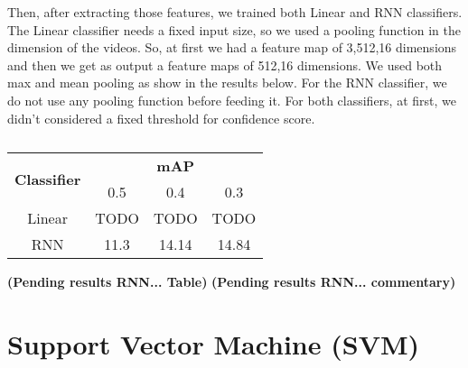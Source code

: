 Then, after extracting those features, we trained both Linear and RNN classifiers. The Linear classifier needs a fixed input size,
so we used a pooling function in the dimension of the videos. So, at first we had a feature map of 3,512,16 dimensions and then we
get as output a feature maps of 512,16 dimensions. We used both max and mean pooling as show in the results below. For the RNN
classifier, we do not use any pooling function before feeding it. For both classifiers, at first, we didn't considered a fixed
threshold for confidence score. 

\begin{table}[h]
  \centering
  \begin{tabular}{|| c || c  c  c ||}
    \hline
    \multirow{2}{*}{\textbf{Classifier}} & {} & \textbf{mAP} & {} \\
    {} & 0.5 & 0.4 & 0.3 \\
    \hline
    Linear & TODO & TODO & TODO \\
    \hline
    RNN    & 11.3 & 14.14 & 14.84 \\
    \hline
  \end{tabular}
  \caption{}
  \label{fig:rnn_linear}
\end{table}

  
\textbf{(Pending results RNN... Table)}
\textbf{(Pending results RNN... commentary)}

\section{Support Vector Machine (SVM)}
